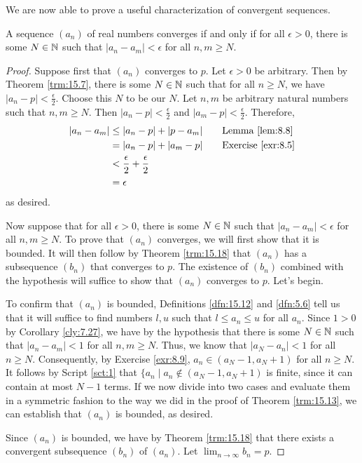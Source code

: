 \documentclass[../main.tex]{subfiles}
\begin{document}
We are now able to prove a useful characterization of convergent sequences.

\begin{theorem}\label{trm:15.19}
    A sequence $(a_n)$ of real numbers converges if and only if for all $\epsilon>0$, there is some $N\in\mathbb{N}$ such that $|a_n-a_m|<\epsilon$ for all $n,m\geq N$.
    \begin{proof}
        Suppose first that $(a_n)$ converges to $p$. Let $\epsilon>0$ be arbitrary. Then by Theorem \ref{trm:15.7}, there is some $N\in\mathbb{N}$ such that for all $n\geq N$, we have $|a_n-p|<\frac{\epsilon}{2}$. Choose this $N$ to be our $N$. Let $n,m$ be arbitrary natural numbers such that $n,m\geq N$. Then $|a_n-p|<\frac{\epsilon}{2}$ and $|a_m-p|<\frac{\epsilon}{2}$. Therefore,
        \begin{align*}
            |a_n-a_m| &\leq |a_n-p|+|p-a_m|\tag*{Lemma \ref{lem:8.8}}\\
            &= |a_n-p|+|a_m-p|\tag*{Exercise \ref{exr:8.5}}\\
            &< \frac{\epsilon}{2}+\frac{\epsilon}{2}\\
            &= \epsilon
        \end{align*}
        as desired.\par\smallskip
        Now suppose that for all $\epsilon>0$, there is some $N\in\mathbb{N}$ such that $|a_n-a_m|<\epsilon$ for all $n,m\geq N$. To prove that $(a_n)$ converges, we will first show that it is bounded. It will then follow by Theorem \ref{trm:15.18} that $(a_n)$ has a subsequence $(b_n)$ that converges to $p$. The existence of $(b_n)$ combined with the hypothesis will suffice to show that $(a_n)$ converges to $p$. Let's begin.\par
        To confirm that $(a_n)$ is bounded, Definitions \ref{dfn:15.12} and \ref{dfn:5.6} tell us that it will suffice to find numbers $l,u$ such that $l\leq a_n\leq u$ for all $a_n$. Since $1>0$ by Corollary \ref{cly:7.27}, we have by the hypothesis that there is some $N\in\mathbb{N}$ such that $|a_n-a_m|<1$ for all $n,m\geq N$. Thus, we know that $|a_N-a_n|<1$ for all $n\geq N$. Consequently, by Exercise \ref{exr:8.9}, $a_n\in(a_N-1,a_N+1)$ for all $n\geq N$. It follows by Script \ref{sct:1} that $\{a_n\mid a_n\notin(a_N-1,a_N+1)$ is finite, since it can contain at most $N-1$ terms. If we now divide into two cases and evaluate them in a symmetric fashion to the way we did in the proof of Theorem \ref{trm:15.13}, we can establish that $(a_n)$ is bounded, as desired.\par
        Since $(a_n)$ is bounded, we have by Theorem \ref{trm:15.18} that there exists a convergent subsequence $(b_n)$ of $(a_n)$. Let $\lim_{n\to\infty}b_n=p$.\par

\end{proof}
\end{theorem}
\end{document}
